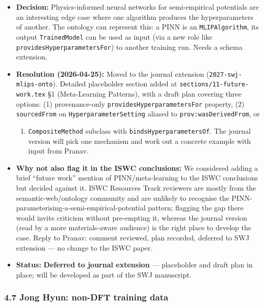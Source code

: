 \begin{itemize}
\tightlist
\item
  \textbf{Decision:} Physics-informed neural networks for semi-empirical potentials are an interesting edge case where one algorithm produces the hyperparameters of another. The ontology can represent this: a PINN is an \texttt{MLIPAlgorithm}, its output \texttt{TrainedModel} can be used as input (via a new role like \texttt{providesHyperparametersFor}) to another training run. Needs a schema extension.
\item
  \textbf{Resolution (2026-04-25):} Moved to the journal extension (\texttt{2027-swj-mlips-onto}). Detailed placeholder section added at \texttt{sections/11-future-work.tex} §1 (Meta-Learning Patterns), with a draft plan covering three options: (1) provenance-only \texttt{providesHyperparametersFor} property, (2) \texttt{sourcedFrom} on \texttt{HyperparameterSetting} aliased to \texttt{prov:wasDerivedFrom}, or

  \begin{enumerate}
  \def\labelenumi{(\arabic{enumi})}
  \setcounter{enumi}{2}
  \tightlist
  \item
    \texttt{CompositeMethod} subclass with \texttt{bindsHyperparametersOf}. The journal version will pick one mechanism and work out a concrete example with input from Pranav.
  \end{enumerate}
\item
  \textbf{Why not also flag it in the ISWC conclusions:} We considered adding a brief ``future work'' mention of PINN/meta-learning to the ISWC conclusions but decided against it. ISWC Resources Track reviewers are mostly from the semantic-web/ontology community and are unlikely to recognise the PINN-parameterising-a-semi-empirical-potential pattern; flagging the gap there would invite criticism without pre-empting it, whereas the journal version (read by a more materials-aware audience) is the right place to develop the case. Reply to Pranav: comment reviewed, plan recorded, deferred to SWJ extension --- no change to the ISWC paper.
\item
  \textbf{Status:} {\color{green!60!black}\faCheckCircle} \textbf{Deferred to journal extension} --- placeholder and draft plan in place; will be developed as part of the SWJ manuscript.
\end{itemize}

\subsubsection{4.7 Jong Hyun: non-DFT training data}\label{jong-hyun-non-dft-training-data}


